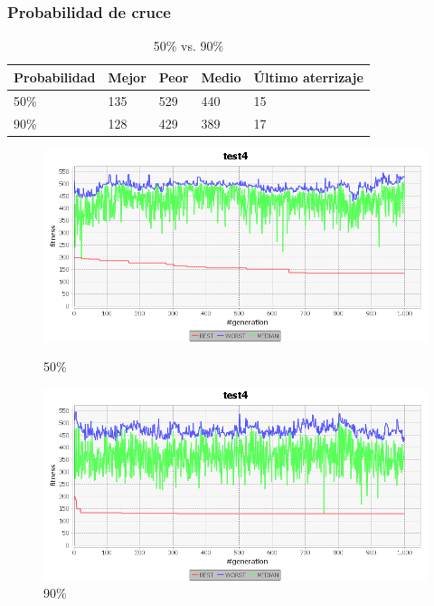 \documentclass[a4paper,12pt,titlepage]{article}
\begin{document}
\subsubsection{Probabilidad de cruce}

\begin{table}[!ht]
\centering
\begin{tabular}{@{}lllll@{}}
\toprule
Probabilidad & Mejor & Peor & Medio & Último aterrizaje \\ \midrule
50\%         & 135   & 529  & 440   & 15                \\
90\%         & 128   & 429  & 389   & 17                \\ \bottomrule
\end{tabular}
\caption{50\% vs. 90\%}
\end{table}

\begin{figure}[!ht]
\centering
\begin{minipage}{.5\textwidth}
  \centering
  \includegraphics[width=\textwidth]{50cruce.png}
  \caption{50\%}
\end{minipage}%
\begin{minipage}{.5\textwidth}
  \centering
  \includegraphics[width=\textwidth]{90cruce.png}
  \caption{90\%}
\end{minipage}
\end{figure}
\end{document}
